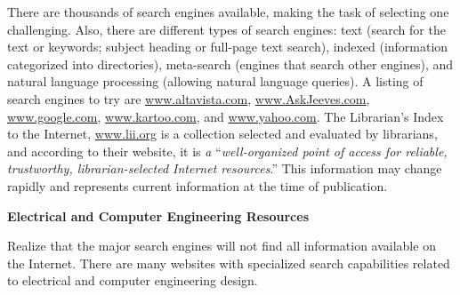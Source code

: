 There are thousands of search engines available, making the task of
selecting one challenging. Also, there are different types of search
engines: text (search for the text or keywords; subject heading or
full-page text search), indexed (information categorized into
directories), meta-search (engines that search other engines), and
natural language processing (allowing natural language queries). A
listing of search engines to try are
\href{http://www.altavista.com}{www.altavista.com},
\href{http://www.AskJeeves.com}{www.AskJeeves.com},
\href{http://www.google.com}{www.google.com},
\href{http://www.kartoo.com}{www.kartoo.com}, and
\href{http://www.yahoo.com}{www.yahoo.com}. The Librarian's Index to the
Internet, \href{http://www.lii.org}{www.lii.org} is a collection
selected and evaluated by librarians, and according to their website, it
is \emph{a} ``\emph{well-organized point of access for reliable,
trustworthy, librarian-selected Internet resources}.'' This information
may change rapidly and represents current information at the time of
publication.

\textbf{Electrical and Computer Engineering Resources}

Realize that the major search engines will not find all information
available on the Internet. There are many websites with specialized
search capabilities related to electrical and computer engineering
design.

